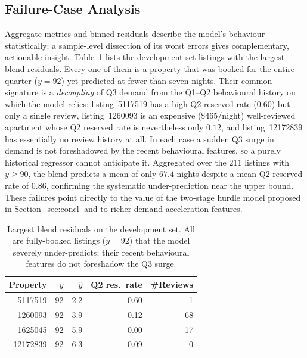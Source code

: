 \documentclass[journal]{IEEEtran}
\begin{document}
\subsection{Failure-Case Analysis}
\label{sec:failure}
Aggregate metrics and binned residuals describe the model's behaviour
statistically; a sample-level dissection of its worst errors gives complementary,
actionable insight. Table~\ref{tab:failure} lists the development-set listings
with the largest blend residuals. Every one of them is a property that was booked
for the entire quarter ($y=92$) yet predicted at fewer than seven nights. Their
common signature is a \emph{decoupling} of Q3 demand from the Q1--Q2 behavioural
history on which the model relies: listing~5117519 has a high Q2 reserved rate
($0.60$) but only a single review, listing~1260093 is an expensive ($\$465$/night)
well-reviewed apartment whose Q2 reserved rate is nevertheless only $0.12$, and
listing~12172839 has essentially no review history at all. In each case a sudden
Q3 surge in demand is not foreshadowed by the recent behavioural features, so a
purely historical regressor cannot anticipate it. Aggregated over the $211$
listings with $y\ge90$, the blend predicts a mean of only $67.4$ nights despite a
mean Q2 reserved rate of $0.86$, confirming the systematic under-prediction near
the upper bound. These failures point directly to the value of the two-stage
hurdle model proposed in Section~\ref{sec:concl} and to richer
demand-acceleration features.

\begin{table}[!t]
\caption{Largest blend residuals on the development set. All are fully-booked
listings ($y=92$) that the model severely under-predicts; their recent
behavioural features do not foreshadow the Q3 surge.}
\label{tab:failure}
\centering
\small
\begin{tabular}{rrrrr}
\toprule
Property & $y$ & $\hat y$ & Q2 res.\ rate & \#Reviews \\
\midrule
5117519  & 92 & 2.2 & 0.60 & 1 \\
1260093  & 92 & 3.9 & 0.12 & 68 \\
1625045  & 92 & 5.9 & 0.00 & 17 \\
12172839 & 92 & 6.3 & 0.09 & 0 \\
\bottomrule
\end{tabular}
\end{table}
\end{document}
